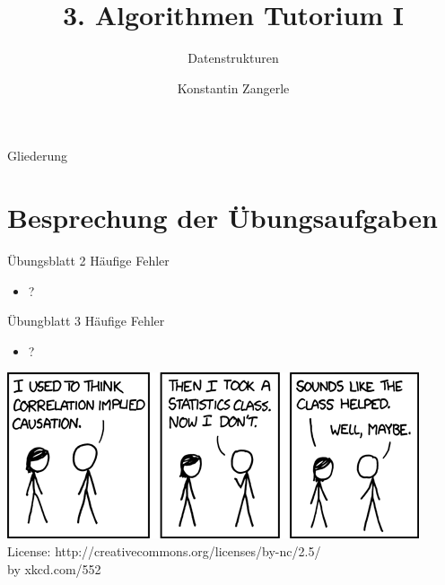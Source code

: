 \documentclass[18pt]{beamer}
\title[Algo I Tut]{3. Algorithmen Tutorium I}
\subtitle{Datenstrukturen}
\author[Zangerle]{Konstantin Zangerle}
\institute{Institut für Theoretische Informatik}
\begin{document}

\begin{frame}
\titlepage
\end{frame}

\begin{frame}{Gliederung}
 \tableofcontents
\end{frame}

\section{Besprechung der Übungsaufgaben}
\begin{frame}{Übungsblatt 2}
Häufige Fehler
\begin{itemize}
 \item ?
\end{itemize}

\end{frame}

\begin{frame}{Übungblatt 3}
Häufige Fehler
\begin{itemize}
 \item ?
\end{itemize}

\end{frame}


\begin{frame}
\includegraphics[scale=0.5]{correlation} \\
License: http://creativecommons.org/licenses/by-nc/2.5/ \\
by xkcd.com/552
\end{frame}
\end{document}
